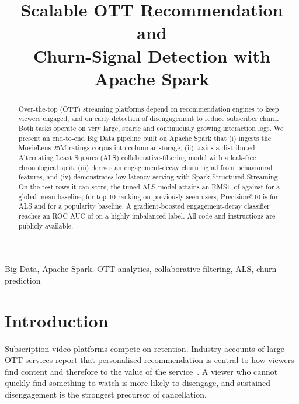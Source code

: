 \documentclass[conference]{IEEEtran}
\begin{document}
\title{Scalable OTT Recommendation and\\Churn-Signal Detection with Apache Spark}

\author{
\and
{}
}
\maketitle

\begin{abstract}
Over-the-top (OTT) streaming platforms depend on recommendation engines to keep viewers engaged, and on early detection of disengagement to reduce subscriber churn. Both tasks operate on very large, sparse and continuously growing interaction logs. We present an end-to-end Big Data pipeline built on Apache Spark that (i) ingests the MovieLens 25M ratings corpus into columnar storage, (ii) trains a distributed Alternating Least Squares (ALS) collaborative-filtering model with a leak-free chronological split, (iii) derives an engagement-decay churn signal from behavioural features, and (iv) demonstrates low-latency serving with Spark Structured Streaming. On the test rows it can score, the tuned ALS model attains an RMSE of \rmseAls{} against \rmseGlobalCov{} for a global-mean baseline; for top-10 ranking on previously seen users, Precision@10 is \precAls{} for ALS and \precPop{} for a popularity baseline. A gradient-boosted engagement-decay classifier reaches an ROC-AUC of \aucGBT{} on a highly imbalanced label. All code and instructions are publicly available.
\end{abstract}

\begin{IEEEkeywords}
Big Data, Apache Spark, OTT analytics, collaborative filtering, ALS, churn prediction
\end{IEEEkeywords}

\section{Introduction}
Subscription video platforms compete on retention. Industry accounts of large OTT services report that personalised recommendation is central to how viewers find content and therefore to the value of the service~\cite{netflix}. A viewer who cannot quickly find something to watch is more likely to disengage, and sustained disengagement is the strongest precursor of cancellation.
\end{document}
